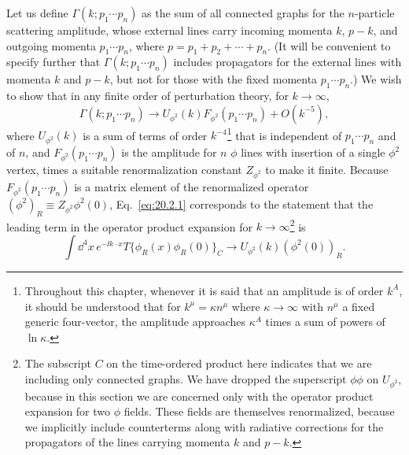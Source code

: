 Let us define $\Gamma(k;p_1\cdots p_n)$ as the sum of all connected graphs
for the $n$-particle scattering amplitude, whose external lines carry
incoming momenta $k$, $p-k$, and outgoing momenta $p_1\cdots p_n$, where
$p=p_1+p_2+\cdots+p_n$. (It will be convenient to specify further that
$\Gamma(k;p_1\cdots p_n)$ includes propagators for the external lines with
momenta $k$ and $p-k$, but not for those with the fixed momenta
$p_1\cdots p_n$.) We wish to show that in any finite order of perturbation
theory, for $k\to\infty$,
\begin{equation}
 \Gamma(k;p_1\cdots p_n)\longrightarrow
 U_{\phi^2}(k)F_{\phi^2}(p_1\cdots p_n)+O(k^{-5}),
 \tag{20.2.1}\label{eq:20.2.1}
\end{equation}
where $U_{\phi^2}(k)$ is a sum of terms of order
$k^{-4}$\footnote{Throughout this chapter, whenever it is said that an
amplitude is of order $k^A$, it should be understood that for
$k^\mu=\kappa n^\mu$ where $\kappa\to\infty$ with $n^\mu$ a fixed generic
four-vector, the amplitude approaches $\kappa^A$ times a sum of powers of
$\ln\kappa$.} that is independent of $p_1\cdots p_n$ and of $n$, and
$F_{\phi^2}(p_1\cdots p_n)$ is the amplitude for $n$ $\phi$ lines with
insertion of a single $\phi^2$ vertex, times a suitable renormalization
constant $Z_{\phi^2}$ to make it finite. Because
$F_{\phi^2}(p_1\cdots p_n)$ is a matrix element of the renormalized operator
$(\phi^2)_R\equiv Z_{\phi^2}\phi^2(0)$, Eq.~\eqref{eq:20.2.1} corresponds
to the statement that the leading term in the operator product expansion for
$k\to\infty$\footnote{The subscript $C$ on the time-ordered product here
indicates that we are including only connected graphs. We have dropped the
superscript $\phi\phi$ on $U_{\phi^2}$, because in this section we are
concerned only with the operator product expansion for two $\phi$ fields.
These fields are themselves renormalized, because we implicitly include
counterterms along with radiative corrections for the propagators of the
lines carrying momenta $k$ and $p-k$.} is
\begin{equation}
 \int \dd^4x\,e^{-\ii k\cdot x}
 T\{\phi_R(x)\phi_R(0)\}_C
 \longrightarrow U_{\phi^2}(k)(\phi^2(0))_R.
 \tag{20.2.2}\label{eq:20.2.2}
\end{equation}

